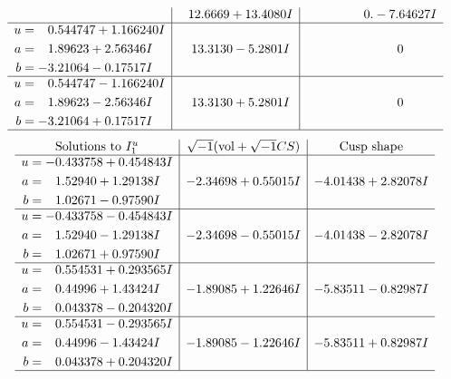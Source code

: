 \documentclass[1p]{elsarticle_modified}
\theoremstyle{definition}
\newcommand{\I}{\sqrt{-1}}
\begin{document}
$$\begin{array}{c|c|c}
 & \phantom{-}12.6669 + 13.4080 I & \phantom{-0.000000 } 0. - 7.64627 I \\ \hline\begin{aligned}
u &= \phantom{-}0.544747 + 1.166240 I \\
a &= \phantom{-}1.89623 + 2.56346 I \\
b &= -3.21064 - 0.17517 I\end{aligned}
 & \phantom{-}13.3130 - 5.2801 I & \phantom{-0.000000 } 0 \\ \hline\begin{aligned}
u &= \phantom{-}0.544747 - 1.166240 I \\
a &= \phantom{-}1.89623 - 2.56346 I \\
b &= -3.21064 + 0.17517 I\end{aligned}
 & \phantom{-}13.3130 + 5.2801 I & \phantom{-0.000000 } 0\\
 \hline 
 \end{array}$$\newpage$$\begin{array}{c|c|c}  
\text{Solutions to }I^u_{1}& \I (\text{vol} + \sqrt{-1}CS) & \text{Cusp shape}\\
 \hline 
\begin{aligned}
u &= -0.433758 + 0.454843 I \\
a &= \phantom{-}1.52940 + 1.29138 I \\
b &= \phantom{-}1.02671 - 0.97590 I\end{aligned}
 & -2.34698 + 0.55015 I & -4.01438 + 2.82078 I \\ \hline\begin{aligned}
u &= -0.433758 - 0.454843 I \\
a &= \phantom{-}1.52940 - 1.29138 I \\
b &= \phantom{-}1.02671 + 0.97590 I\end{aligned}
 & -2.34698 - 0.55015 I & -4.01438 - 2.82078 I \\ \hline\begin{aligned}
u &= \phantom{-}0.554531 + 0.293565 I \\
a &= \phantom{-}0.44996 + 1.43424 I \\
b &= \phantom{-}0.043378 - 0.204320 I\end{aligned}
 & -1.89085 + 1.22646 I & -5.83511 - 0.82987 I \\ \hline\begin{aligned}
u &= \phantom{-}0.554531 - 0.293565 I \\
a &= \phantom{-}0.44996 - 1.43424 I \\
b &= \phantom{-}0.043378 + 0.204320 I\end{aligned}
 & -1.89085 - 1.22646 I & -5.83511 + 0.82987 I\\
 \hline 
 \end{array}$$\newpage\newpage\renewcommand{\arraystretch}{1}
\end{document}
